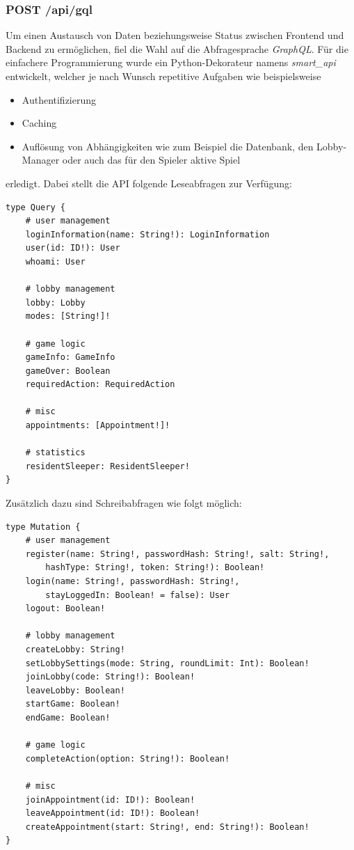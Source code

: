 \subsubsection{POST /api/gql}
Um einen Austausch von Daten beziehungsweise Status zwischen Frontend und Backend zu ermöglichen, fiel die Wahl auf die Abfragesprache \textit{GraphQL}. Für die einfachere Programmierung wurde ein Python-Dekorateur namens \textit{smart\_api} entwickelt, welcher je nach Wunsch repetitive Aufgaben wie beispielsweise 
\begin{itemize}
	\item Authentifizierung
	\item Caching
	\item Auflösung von Abhängigkeiten wie zum Beispiel die Datenbank, den Lobby-Manager oder auch das für den Spieler aktive Spiel
\end{itemize}
erledigt. Dabei stellt die API folgende Leseabfragen zur Verfügung:

\begin{lstlisting}
type Query {
	# user management
	loginInformation(name: String!): LoginInformation
	user(id: ID!): User
	whoami: User
	
	# lobby management
	lobby: Lobby
	modes: [String!]!
	
	# game logic
	gameInfo: GameInfo
	gameOver: Boolean
	requiredAction: RequiredAction
	
	# misc
	appointments: [Appointment!]!
	
	# statistics
	residentSleeper: ResidentSleeper!
}
\end{lstlisting}

Zusätzlich dazu sind Schreibabfragen wie folgt möglich:

\begin{lstlisting}
type Mutation {
	# user management
	register(name: String!, passwordHash: String!, salt: String!, 
		hashType: String!, token: String!): Boolean!
	login(name: String!, passwordHash: String!, 
		stayLoggedIn: Boolean! = false): User
	logout: Boolean!
	
	# lobby management
	createLobby: String!
	setLobbySettings(mode: String, roundLimit: Int): Boolean!
	joinLobby(code: String!): Boolean!
	leaveLobby: Boolean!
	startGame: Boolean!
	endGame: Boolean!
	
	# game logic
	completeAction(option: String!): Boolean!
	
	# misc
	joinAppointment(id: ID!): Boolean!
	leaveAppointment(id: ID!): Boolean!
	createAppointment(start: String!, end: String!): Boolean!
}
\end{lstlisting}

